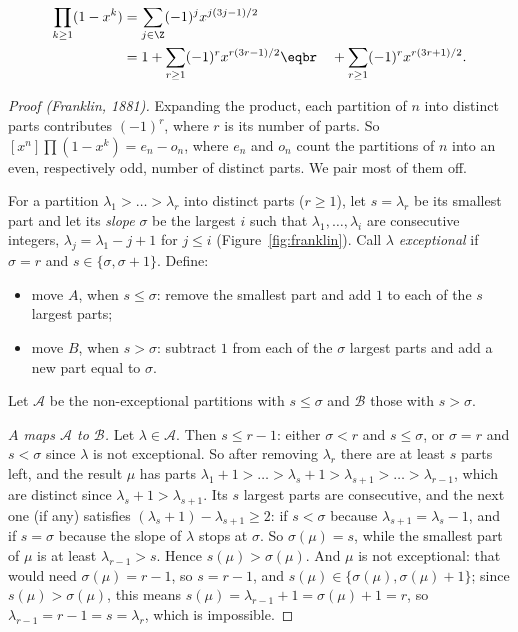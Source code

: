 \begin{theorem}\label{thm:pentagonal}
\[
\begin{aligned}\prod_{k\ge1}(1-x^k)&=\sum_{j\in\Z}(-1)^jx^{j(3j-1)/2}\\&=1+\sum_{r\ge1}(-1)^rx^{r(3r-1)/2}\eqbr\quad+\sum_{r\ge1}(-1)^rx^{r(3r+1)/2}.\end{aligned}
\]
\end{theorem}
\begin{proof}[Proof (Franklin, 1881)]
Expanding the product, each partition of $n$ into distinct parts contributes $(-1)^r$, where $r$ is its number of
parts. So $[x^n]\prod(1-x^k)=e_n-o_n$, where $e_n$ and $o_n$ count the partitions of $n$ into an even, respectively odd,
number of distinct parts. We pair most of them off.

For a partition $\lambda_1>\dots>\lambda_r$ into distinct parts ($r\ge1$), let $s=\lambda_r$ be its smallest part and let its
\emph{slope} $\sigma$ be the largest $i$ such that $\lambda_1,\dots,\lambda_i$ are consecutive integers, $\lambda_j=\lambda_1-j+1$ for
$j\le i$ (Figure~\ref{fig:franklin}). Call $\lambda$ \emph{exceptional} if $\sigma=r$ and $s\in\{\sigma,\sigma+1\}$. Define:
\begin{itemize}
\item move $A$, when $s\le\sigma$: remove the smallest part and add $1$ to each of the $s$ largest parts;
\item move $B$, when $s>\sigma$: subtract $1$ from each of the $\sigma$ largest parts and add a new part equal to $\sigma$.
\end{itemize}
Let $\mathcal A$ be the non-exceptional partitions with $s\le\sigma$ and $\mathcal B$ those with $s>\sigma$.

\emph{$A$ maps $\mathcal A$ to $\mathcal B$.} Let $\lambda\in\mathcal A$. Then $s\le r-1$: either $\sigma<r$ and $s\le\sigma$, or $\sigma=r$
and $s<\sigma$ since $\lambda$ is not exceptional. So after removing $\lambda_r$ there are at least $s$ parts left, and the result
$\mu$ has parts $\lambda_1+1>\dots>\lambda_s+1>\lambda_{s+1}>\dots>\lambda_{r-1}$, which are distinct since $\lambda_s+1>\lambda_{s+1}$. Its $s$
largest parts are consecutive, and the next one (if any) satisfies $(\lambda_s+1)-\lambda_{s+1}\ge2$: if $s<\sigma$ because
$\lambda_{s+1}=\lambda_s-1$, and if $s=\sigma$ because the slope of $\lambda$ stops at $\sigma$. So $\sigma(\mu)=s$, while the smallest part
of $\mu$ is at least $\lambda_{r-1}>s$. Hence $s(\mu)>\sigma(\mu)$. And $\mu$ is not exceptional: that would need $\sigma(\mu)=r-1$,
so $s=r-1$, and $s(\mu)\in\{\sigma(\mu),\sigma(\mu)+1\}$; since $s(\mu)>\sigma(\mu)$, this means $s(\mu)=\lambda_{r-1}+1=\sigma(\mu)+1=r$, so $\lambda_{r-1}=r-1=s=\lambda_r$, which is impossible.


\end{proof}
